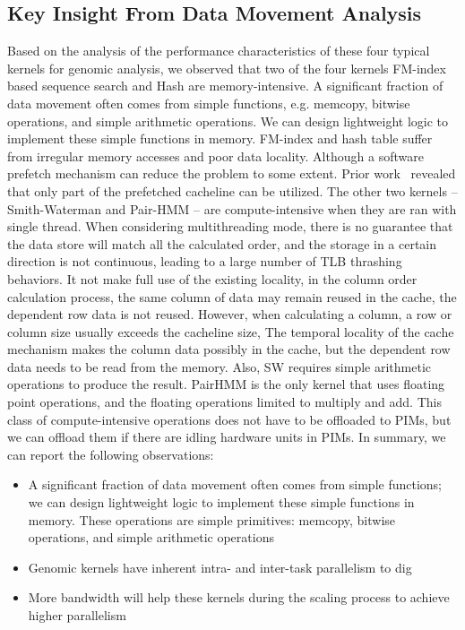 \subsection{Key Insight From Data Movement Analysis}
Based on the analysis of the performance characteristics of these four typical kernels for genomic analysis, we observed that two of the four kernels FM-index based sequence search and Hash are memory-intensive. A significant fraction of data movement often comes from simple functions, e.g. memcopy, bitwise operations, and simple arithmetic operations. We can design lightweight logic to implement these simple functions in memory. FM-index and hash table suffer from irregular memory accesses and poor data locality. Although a software prefetch mechanism can reduce the problem to some extent. Prior work~\cite{yuanrong} revealed that only part of the prefetched cacheline can be utilized. The other two kernels -- Smith-Waterman and Pair-HMM -- are compute-intensive when they are ran with single thread. When considering multithreading mode, there is no guarantee that the data store will match all the calculated order, and the storage in a certain direction is not continuous, leading to a large number of TLB thrashing behaviors. It not make full use of the existing locality, in the column order calculation process, the same column of data may remain reused in the cache, the dependent row data is not reused. However, when calculating a column, a row or column size usually exceeds the cacheline size, The temporal locality of the cache mechanism makes the column data possibly in the cache, but the dependent row data needs to be read from the memory. Also, SW requires simple arithmetic operations to produce the result. PairHMM is the only kernel that uses floating point operations, and the floating operations limited to multiply and add. This class of compute-intensive operations does not have to be offloaded to PIMs, but we can offload them if there are idling hardware units in PIMs. In summary, we can report the following observations:

\begin{itemize}
    
    \item A significant fraction of data movement often comes from simple functions; we can design lightweight logic to implement these simple functions in memory. These operations are simple primitives: memcopy, bitwise operations, and simple arithmetic operations
    
    \item Genomic kernels have inherent intra- and inter-task parallelism to dig
    
    \item More bandwidth will help these kernels during the scaling process to achieve higher parallelism

\end{itemize}
